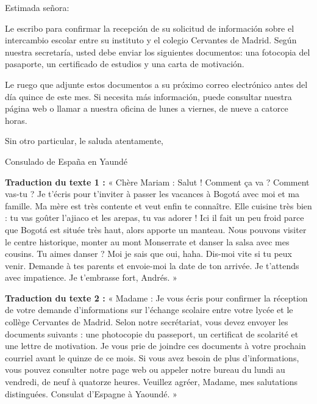 \documentclass[11pt]{article}
\begin{document}
\begin{textebox}
Estimada señora:

Le escribo para confirmar la recepción de su solicitud de información sobre el intercambio escolar entre su instituto y el colegio Cervantes de Madrid. Según nuestra secretaría, usted debe enviar los siguientes documentos: una fotocopia del pasaporte, un certificado de estudios y una carta de motivación.

Le ruego que adjunte estos documentos a su próximo correo electrónico antes del día quince de este mes. Si necesita más información, puede consultar nuestra página web o llamar a nuestra oficina de lunes a viernes, de nueve a catorce horas.

Sin otro particular, le saluda atentamente,

Consulado de España en Yaundé
\end{textebox}

\textbf{Traduction du texte 1 :} « Chère Mariam : Salut ! Comment ça va ? Comment vas-tu ? Je t'écris pour t'inviter à passer les vacances à Bogotá avec moi et ma famille. Ma mère est très contente et veut enfin te connaître. Elle cuisine très bien : tu vas goûter l'ajiaco et les arepas, tu vas adorer ! Ici il fait un peu froid parce que Bogotá est située très haut, alors apporte un manteau. Nous pouvons visiter le centre historique, monter au mont Monserrate et danser la salsa avec mes cousins. Tu aimes danser ? Moi je sais que oui, haha. Dis-moi vite si tu peux venir. Demande à tes parents et envoie-moi la date de ton arrivée. Je t'attends avec impatience. Je t'embrasse fort, Andrés. »

\textbf{Traduction du texte 2 :} « Madame : Je vous écris pour confirmer la réception de votre demande d'informations sur l'échange scolaire entre votre lycée et le collège Cervantes de Madrid. Selon notre secrétariat, vous devez envoyer les documents suivants : une photocopie du passeport, un certificat de scolarité et une lettre de motivation. Je vous prie de joindre ces documents à votre prochain courriel avant le quinze de ce mois. Si vous avez besoin de plus d'informations, vous pouvez consulter notre page web ou appeler notre bureau du lundi au vendredi, de neuf à quatorze heures. Veuillez agréer, Madame, mes salutations distinguées. Consulat d'Espagne à Yaoundé. »
\end{document}
